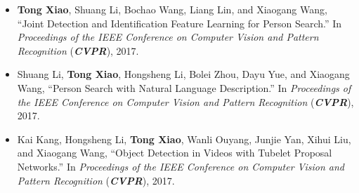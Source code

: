 \begin{itemize}
  \item \textbf{Tong Xiao}, Shuang Li, Bochao Wang, Liang Lin, and Xiaogang Wang, ``Joint Detection and Identification Feature Learning for Person Search.'' In \textit{Proceedings of the IEEE Conference on Computer Vision and Pattern Recognition} (\textit{\textbf{CVPR}}), 2017.

  \item Shuang Li, \textbf{Tong Xiao}, Hongsheng Li, Bolei Zhou, Dayu Yue, and Xiaogang Wang, ``Person Search with Natural Language Description.'' In \textit{Proceedings of the IEEE Conference on Computer Vision and Pattern Recognition} (\textit{\textbf{CVPR}}), 2017.

  \item Kai Kang, Hongsheng Li, \textbf{Tong Xiao}, Wanli Ouyang, Junjie Yan, Xihui Liu, and Xiaogang Wang, ``Object Detection in Videos with Tubelet Proposal Networks.'' In \textit{Proceedings of the IEEE Conference on Computer Vision and Pattern Recognition} (\textit{\textbf{CVPR}}), 2017.

\end{itemize}
